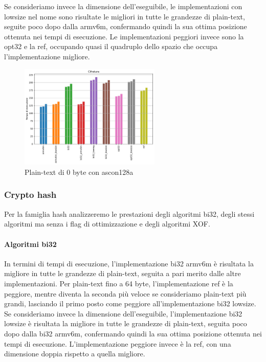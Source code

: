 \documentclass[12pt,a4paper,italian]{report}
\begin{document}
\noindent Se consideriamo invece la dimensione dell'eseguibile, le implementazioni con lowsize nel nome sono risultate le migliori in tutte le grandezze di plain-text, seguite poco dopo dalla armv6m, confermando quindi la sua ottima posizione ottenuta nei tempi di esecuzione. Le implementazioni peggiori invece sono la opt32 e la ref, occupando quasi il quadruplo dello spazio che occupa l'implementazione migliore.

\begin{figure}[H]
    \centering
    \includegraphics[width=0.6\textwidth]{adafruit/ascon128a.pdf}
    \caption{Plain-text di 0 byte con ascon128a}
\end{figure}

\subsubsection{Crypto hash}

Per la famiglia hash analizzeremo le prestazioni degli algoritmi bi32, degli stessi algoritmi ma senza i flag di ottimizzazione e degli algoritmi XOF.

\paragraph{Algoritmi bi32}

In termini di tempi di esecuzione, l'implementazione bi32 armv6m è risultata la migliore in tutte le grandezze di plain-text, seguita a pari merito dalle altre implementazioni. Per plain-text fino a 64 byte, l'implementazione ref è la peggiore, mentre diventa la seconda più veloce se consideriamo plain-text più grandi, lasciando il primo posto come peggiore all'implementazione bi32 lowsize. \\

\noindent Se consideriamo invece la dimensione dell'eseguibile, l'implementazione bi32 lowsize è risultata la migliore in tutte le grandezze di plain-text, seguita poco dopo dalla bi32 armv6m, confermando quindi la sua ottima posizione ottenuta nei tempi di esecuzione. L'implementazione peggiore invece è la ref, con una dimensione doppia rispetto a quella migliore.
\end{document}
